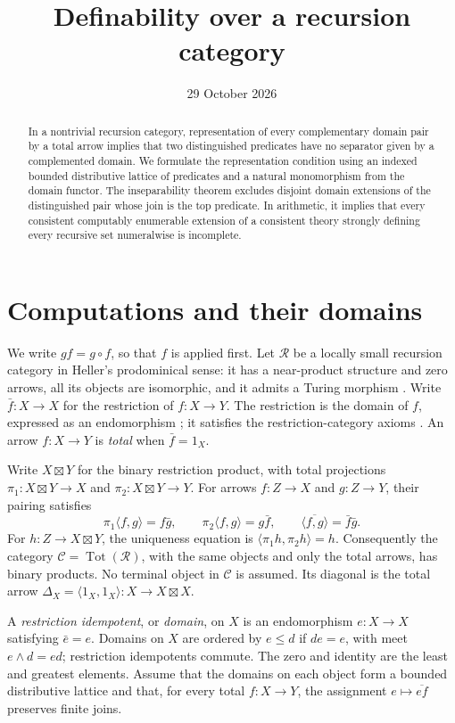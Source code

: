 \documentclass[11pt]{article}
\title{Definability over a recursion category}
\author{}
\date{29 October 2026}
\theoremstyle{definition}
\newcommand{\R}{\mathcal R}
\newcommand{\C}{\mathcal C}
\newcommand{\Tot}{\operatorname{Tot}}
\begin{document}
\maketitle

\begin{abstract}
In a nontrivial recursion category, representation of every complementary
domain pair by a total arrow implies that two distinguished predicates have
no separator given by a complemented domain. We formulate the representation
condition using an indexed bounded distributive lattice of predicates and a
natural monomorphism from the domain functor. The inseparability theorem
excludes disjoint domain extensions of the distinguished pair whose join is
the top predicate. In arithmetic, it implies that every consistent computably
enumerable extension of a consistent theory strongly defining every recursive
set numeralwise is incomplete.
\end{abstract}

\section{Computations and their domains}

We write $gf=g\circ f$, so that $f$ is applied first. Let $\R$ be a
locally small recursion category in Heller's prodominical sense: it has a
near-product structure and zero arrows, all its objects are isomorphic,
and it admits a Turing morphism \cite[Sections~5 and~9]{Heller}.
Write $\bar f:X\to X$ for the restriction of $f:X\to Y$.
The restriction is the domain of $f$, expressed as an endomorphism
\cite[Section~3]{DPH}; it satisfies the restriction-category axioms
\cite[Section~2.1.1]{RestrictionI}.
An arrow $f:X\to Y$ is \emph{total} when $\bar f=1_X$.

Write $X\boxtimes Y$ for the binary restriction product, with total
projections $\pi_1:X\boxtimes Y\to X$ and
$\pi_2:X\boxtimes Y\to Y$. For arrows $f:Z\to X$ and $g:Z\to Y$,
their pairing satisfies
\[
 \pi_1\langle f,g\rangle=f\bar g,
 \qquad \pi_2\langle f,g\rangle=g\bar f,
 \qquad \overline{\langle f,g\rangle}=\bar f\bar g.
\]
For $h:Z\to X\boxtimes Y$, the uniqueness equation is
$\langle\pi_1h,\pi_2h\rangle=h$.
Consequently the category $\C=\Tot(\R)$, with the same objects and only
the total arrows, has binary products. No terminal object in $\C$ is
assumed. Its diagonal is the total arrow
$\Delta_X=\langle1_X,1_X\rangle:X\to X\boxtimes X$.

A \emph{restriction idempotent}, or \emph{domain}, on $X$ is an
endomorphism $e:X\to X$ satisfying $\bar e=e$. Domains on $X$ are
ordered by $e\leq d$ if $de=e$, with meet $e\wedge d=ed$;
restriction idempotents commute. The zero and identity are the least
and greatest elements. Assume that the domains on each object form a
bounded distributive lattice and that, for every total $f:X\to Y$,
the assignment $e\mapsto\overline{ef}$ preserves finite joins.
\end{document}
